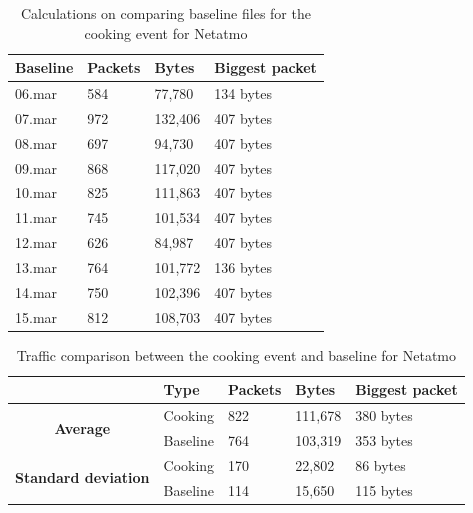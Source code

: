 \begin{table}[H]
    \centering
    \caption{Calculations on comparing baseline files for the cooking event for Netatmo}
    \begin{tabular}{|l|l|l|l|}
    \hline
        \textbf{Baseline} & \textbf{Packets} & \textbf{Bytes} & \textbf{Biggest packet} \\ \hline
        06.mar & 584 & 77,780 & 134 bytes\\ \hline
        07.mar & 972 & 132,406 & 407 bytes\\ \hline
        08.mar & 697 & 94,730 & 407 bytes \\ \hline
        09.mar & 868 & 117,020 & 407 bytes \\ \hline
        10.mar & 825 & 111,863 & 407 bytes \\ \hline
        11.mar & 745 & 101,534 & 407 bytes \\ \hline
        12.mar & 626 & 84,987 & 407 bytes \\ \hline
        13.mar & 764 & 101,772 & 136 bytes \\ \hline
        14.mar & 750 & 102,396 & 407 bytes \\ \hline
        15.mar & 812 & 108,703 & 407 bytes \\ \hline
    \end{tabular}
    \label{tab:NetatmoBaselineCookingCalculations}
\end{table}

\begin{table}[H]
    \centering
    \caption{Traffic comparison between the cooking event and baseline for Netatmo}
    \begin{tabular}{c|l|l|l|l|}
        \cline{2-5}
        \multicolumn{1}{l|}{}                                              & \textbf{Type} & \textbf{Packets} & \textbf{Bytes} & \textbf{Biggest packet} \\ \hline
        \multicolumn{1}{|c|}{\multirow{2}{*}{\textbf{Average}}}            & Cooking         & 822              & 111,678        & 380 bytes               \\ \cline{2-5} 
        \multicolumn{1}{|c|}{}                                             & Baseline      & 764              & 103,319        & 353 bytes                \\ \hline
        \multicolumn{1}{|c|}{\multirow{2}{*}{\textbf{Standard deviation}}} & Cooking         & 170              & 22,802         & 86 bytes                 \\ \cline{2-5} 
        \multicolumn{1}{|c|}{}                                             & Baseline      & 114              & 15,650         & 115 bytes               \\ \hline          
    \end{tabular}
    \label{tab:NetatmoComparingBaselineAndCookingCalculations}
\end{table}

